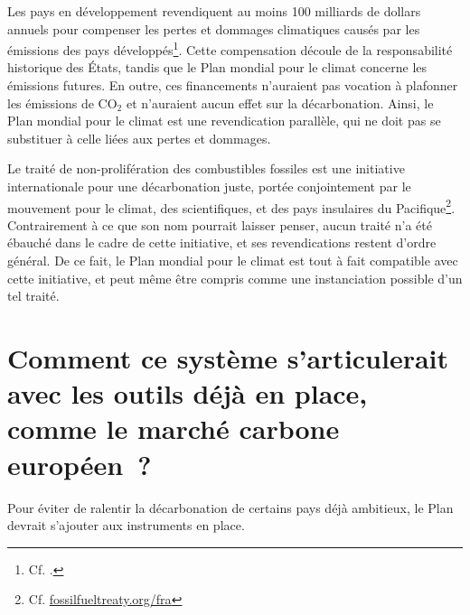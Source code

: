 \documentclass[a5paper,french,openany]{memoir}
\begin{document}
Les pays en développement revendiquent au moins 100 milliards de dollars annuels pour compenser les pertes et dommages climatiques causés par les émissions des pays développés\footnote{Cf. \cite{tc_proposal_2023}.}. Cette compensation découle de la responsabilité historique des États, tandis que le Plan mondial pour le climat concerne les émissions futures. En outre, ces financements n'auraient pas vocation à plafonner les émissions de CO$_\text{2}$ et n'auraient aucun effet sur la décarbonation. %
Ainsi, le Plan mondial pour le climat est une revendication parallèle, qui ne doit pas se substituer à celle liées aux pertes et dommages.

Le traité de non-prolifération des combustibles fossiles est une initiative internationale pour une décarbonation juste, portée conjointement par le mouvement pour le climat, des scientifiques, et des pays insulaires du Pacifique\footnote{Cf. \href{https://fossilfueltreaty.org/fra}{fossilfueltreaty.org/fra}}. Contrairement à ce que son nom pourrait laisser penser, aucun traité n'a été ébauché dans le cadre de cette initiative, et ses revendications restent d'ordre général. De ce fait, le Plan mondial pour le climat est tout à fait compatible avec cette initiative, et peut même être compris comme une instanciation possible d'un tel traité.

\section*{\normalsize Comment ce système s'articulerait avec les outils déjà en place, comme le marché carbone européen~?}\label{q:ets}

Pour éviter de ralentir la décarbonation de certains pays déjà ambitieux, le Plan devrait s'ajouter aux instruments en place. 
\end{document}
